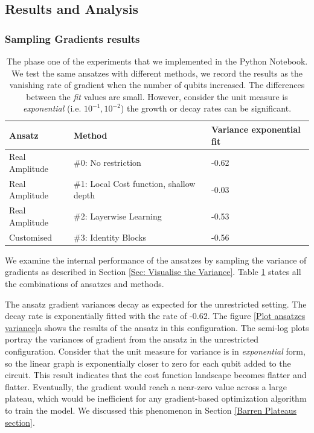 \subsection{Results and Analysis} \label{Result section}

\subsubsection{Sampling Gradients results} \label{Sec: Sampling Gradients results}
\begin{table}
    \centering
    \begin{tabular}{|| l l l ||}
        \hline
        \textbf{Ansatz} & \textbf{Method}                         & \textbf{Variance exponential fit} \\[0.5ex]
        \hline \hline
        Real Amplitude  & \#0: No restriction                     & -0.62                             \\
        Real Amplitude  & \#1: Local Cost function, shallow depth & -0.03                             \\
        Real Amplitude  & \#2: Layerwise Learning                 & -0.53                             \\
        Customised      & \#3: Identity Blocks                    & -0.56                             \\
        \hline
    \end{tabular}
    \caption{
        The phase one of the experiments that we implemented in the Python Notebook.
        We test the same ansatzes with different methods, we record the results as the vanishing rate of gradient when the number of qubits increased.
        The differences between the \emph{fit} values are small.
        However, consider the unit measure is \emph{exponential} (i.e. $10^{-1}, 10^{-2}$) the growth or decay rates can be significant.
    }
    \label{Tab: Experiment Phase 1 Res}
\end{table}

We examine the internal performance of the ansatzes by sampling the variance of gradients as described in Section \ref{Sec: Visualise the Variance}.
Table \ref{Tab: Experiment Phase 1 Res} states all the combinations of ansatzes and methods.

The ansatz gradient variances decay as expected for the unrestricted setting.
The decay rate is exponentially fitted with the rate of -0.62.
The figure \ref{Plot ansatzes variance}a shows the results of the ansatz in this configuration.
The semi-log plots portray the variances of gradient from the ansatz in the unrestricted configuration.
Consider that the unit measure for variance is in \emph{exponential} form, so the linear graph is exponentially closer to zero for each qubit added to the circuit.
This result indicates that the cost function landscape becomes flatter and flatter.
Eventually, the gradient would reach a near-zero value across a large plateau, which would be inefficient for any gradient-based optimization algorithm to train the model.
We discussed this phenomenon in Section \ref{Barren Plateaus section}.


